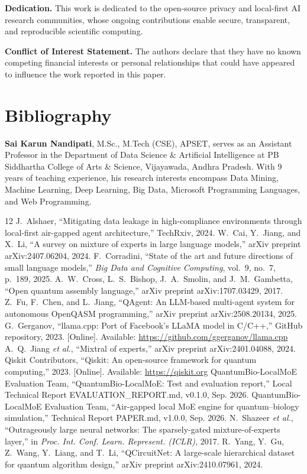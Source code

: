 \documentclass[journal]{IEEEtran}
\begin{document}
\textbf{Dedication.} This work is dedicated to the open-source privacy and
local-first AI research communities, whose ongoing contributions enable secure,
transparent, and reproducible scientific computing.

\textbf{Conflict of Interest Statement.} The authors declare that they have no
known competing financial interests or personal relationships that could have
appeared to influence the work reported in this paper.

\section*{Bibliography}
\textbf{Sai Karun Nandipati}, M.Sc., M.Tech (CSE), APSET, serves as an Assistant
Professor in the Department of Data Science \& Artificial Intelligence at PB
Siddhartha College of Arts \& Science, Vijayawada, Andhra Pradesh. With 9 years
of teaching experience, his research interests encompass Data Mining, Machine
Learning, Deep Learning, Big Data, Microsoft Programming Languages, and Web
Programming.

\begin{thebibliography}{12}
 J.~Alshaer, ``Mitigating data leakage in high-compliance
environments through local-first air-gapped agent architecture,'' TechRxiv,
2024.
 W.~Cai, Y.~Jiang, and X.~Li, ``A survey on mixture of
experts in large language models,'' arXiv preprint arXiv:2407.06204, 2024.
 F.~Corradini, ``State of the art and future directions
of small language models,'' \emph{Big Data and Cognitive Computing}, vol.~9,
no.~7, p.~189, 2025.
 A.~W.~Cross, L.~S.~Bishop, J.~A.~Smolin, and J.~M.~Gambetta,
``Open quantum assembly language,'' arXiv preprint arXiv:1707.03429, 2017.
 Z.~Fu, F.~Chen, and L.~Jiang, ``QAgent: An LLM-based
multi-agent system for autonomous OpenQASM programming,'' arXiv preprint
arXiv:2508.20134, 2025.
 G.~Gerganov, ``llama.cpp: Port of Facebook's LLaMA model in
C/C++,'' GitHub repository, 2023. [Online]. Available:
\url{https://github.com/ggerganov/llama.cpp}
 A.~Q.~Jiang \emph{et al.}, ``Mixtral of experts,'' arXiv
preprint arXiv:2401.04088, 2024.
 Qiskit Contributors, ``Qiskit: An open-source framework for
quantum computing,'' 2023. [Online]. Available: \url{https://qiskit.org}
 QuantumBio-LocalMoE Evaluation Team, ``QuantumBio-LocalMoE:
Test and evaluation report,'' Local Technical Report EVALUATION\_REPORT.md,
v0.1.0, Sep. 2026.
 QuantumBio-LocalMoE Evaluation Team, ``Air-gapped local MoE
engine for quantum--biology simulation,'' Technical Report PAPER.md, v1.0.0,
Sep. 2026.
 N.~Shazeer \emph{et al.}, ``Outrageously large neural
networks: The sparsely-gated mixture-of-experts layer,'' in \emph{Proc. Int.
Conf. Learn. Represent. (ICLR)}, 2017.
 R.~Yang, Y.~Gu, Z.~Wang, Y.~Liang, and T.~Li,
``QCircuitNet: A large-scale hierarchical dataset for quantum algorithm
design,'' arXiv preprint arXiv:2410.07961, 2024.
\end{thebibliography}
\end{document}
